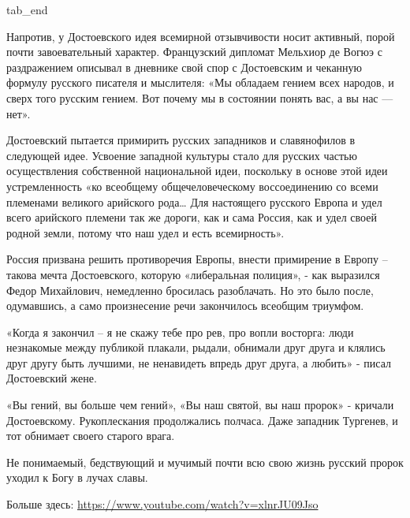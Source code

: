   tab_end
\fi

Напротив, у Достоевского идея всемирной отзывчивости носит активный, порой
почти завоевательный характер. Французский дипломат Мельхиор де Вогюэ с
раздражением описывал в дневнике свой спор с Достоевским и чеканную формулу
русского писателя и мыслителя: «Мы обладаем гением всех народов, и сверх того
русским гением. Вот почему мы в состоянии понять вас, а вы нас — нет». 

Достоевский пытается примирить русских западников и славянофилов в следующей
идее. Усвоение западной культуры стало для русских частью осуществления
собственной национальной идеи, поскольку в основе этой идеи устремленность «ко
всеобщему общечеловеческому воссоединению со всеми племенами великого арийского
рода… Для настоящего русского Европа и удел всего арийского племени так же
дороги, как и сама Россия, как и удел своей родной земли, потому что наш удел и
есть всемирность».

Россия призвана решить противоречия Европы, внести примирение в Европу – такова
мечта Достоевского, которую «либеральная полиция», - как выразился Федор
Михайлович, немедленно бросилась разоблачать. Но это было после, одумавшись, а
само произнесение речи закончилось всеобщим триумфом.

«Когда я закончил – я не скажу тебе про рев, про вопли восторга: люди
незнакомые между публикой плакали, рыдали, обнимали друг друга и клялись друг
другу быть лучшими, не ненавидеть впредь друг друга, а любить» - писал
Достоевский жене.

«Вы гений, вы больше чем гений», «Вы наш святой, вы наш пророк» - кричали
Достоевскому. Рукоплескания продолжались полчаса. Даже западник Тургенев, и тот
обнимает своего старого врага. 

Не понимаемый, бедствующий и мучимый почти всю свою жизнь русский пророк уходил
к Богу в лучах славы.

Больше здесь: \url{https://www.youtube.com/watch?v=xlnrJU09Jso}

